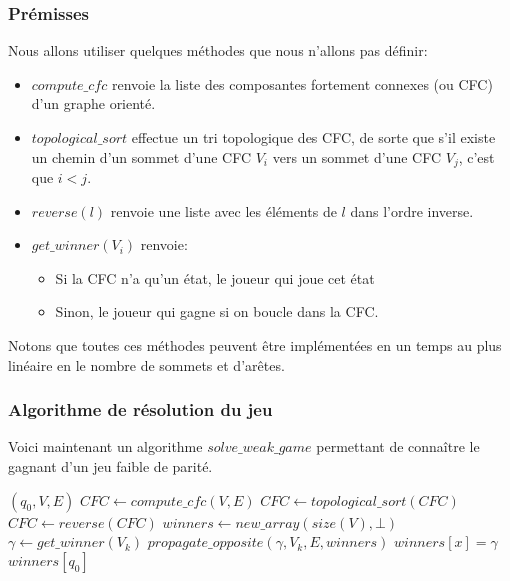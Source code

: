\documentclass[10pt,a4paper]{article}
\begin{document}
\subsubsection{Prémisses}
Nous allons utiliser quelques méthodes que nous n'allons pas définir:
\begin{itemize}
	\item $compute\_cfc$ renvoie la liste des composantes fortement connexes (ou CFC) d'un graphe orienté.
	\item $topological\_sort$ effectue un tri topologique des CFC, de sorte que s'il existe un chemin d'un sommet d'une CFC $V_i$ vers un sommet d'une CFC $V_j$, c'est que $i < j$.
	\item $reverse(l)$ renvoie une liste avec les éléments de $l$ dans l'ordre inverse.
	\item $get\_winner(V_i)$ renvoie:
	\begin{itemize}
		\item Si la CFC n'a qu'un état, le joueur qui joue cet état
		\item Sinon, le joueur qui gagne si on boucle dans la CFC.
	\end{itemize}
\end{itemize}
Notons que toutes ces méthodes peuvent être implémentées en un temps au plus linéaire en le nombre de sommets et d'arêtes.

\subsubsection{Algorithme de résolution du jeu}
Voici maintenant un algorithme $solve\_weak\_game$ permettant de connaître le gagnant d'un jeu faible de parité.

\begin{algorithm}
	\caption{$solve\_weak\_game$}
\begin{algorithmic}[1]
	\REQUIRE $(q_0, V, E)$ 
	\STATE $CFC \leftarrow compute\_cfc(V, E)$
	\STATE $CFC \leftarrow topological\_sort(CFC)$
	\STATE $CFC \leftarrow reverse(CFC)$
	\STATE $winners \leftarrow new\_array(size(V), \bot)$
		\STATE $\gamma \leftarrow get\_winner(V_k)$
		\STATE $propagate\_opposite(\gamma, V_k, E, winners)$
				\STATE $winners[x] = \gamma$
			\ENDIF
		\ENDFOR
	\ENDFOR
	\RETURN $winners[q_0]$
\end{algorithmic}
\end{algorithm}
\end{document}
